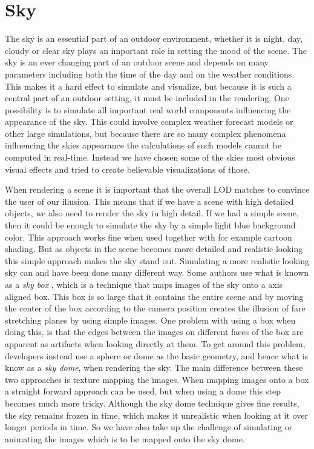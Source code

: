 
\chapter{Sky}
The sky is an essential part of an outdoor environment, whether it is
night, day, cloudy or clear sky plays an important role in setting the
mood of the scene. 
The sky is an ever changing part of an outdoor scene
and depends on many parameters including both the time of the day and
on the weather conditions.
%
This makes it a hard effect to simulate and visualize, but because it
is such a central part of an outdoor setting, it must be included in
the rendering.
%
One possibility is to simulate all important real world components
influencing the appearance of the sky. This could involve complex
weather forecast models or other large simulations, but because
there are so many complex phenomena influencing the skies appearance the
calculations of such models cannot be computed in real-time. Instead
we have chosen some of the skies most obvious visual effects and tried
to create believable visualizations of those.

When rendering a scene it is important that the overall LOD
matches to convince the user of our illusion. This means that if we
have a scene with high detailed objects, we also need to render the
sky in high detail. If we had a simple scene, then it could be enough to
simulate the sky by a simple light blue background color. This
approach works fine when used together with for example cartoon
shading. But as objects in the scene becomes more detailed and
realistic looking this simple approach makes the sky stand out. 
%
Simulating a more realistic looking sky can and have been done many
different way. Some authors use what is known as a \emph{sky box}
,
which is a technique that maps images of the sky onto a axis aligned
box. This box is so large that it contains the entire scene and by
moving the center of the box according to the camera position creates
the illusion of fare stretching planes by using simple images.
%
One problem with using a box when doing this, is that the edges
between the images on different faces of the box are apparent as
artifacts when looking directly at them. To get around this problem,
developers instead use a sphere or dome as the basic geometry, and
hence what is know as a \emph{sky dome}, when rendering the sky. The
main difference between these two approaches is texture mapping
the images. When mapping images onto a box a straight forward approach
can be used, but when using a dome this step becomes much more tricky.
%
Although the sky dome technique gives fine results, the sky remains
frozen in time, which makes it unrealistic when looking at it over
longer periods in time. 
%
So we have also take up the challenge of simulating or animating the
images which is to be mapped onto the sky dome.

